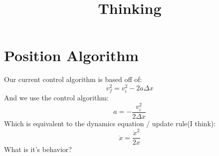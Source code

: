 \documentclass{article}
\begin{document}
\title{Thinking}
\maketitle

\section*{Position Algorithm}
Our current control algorithm is based off of:
\begin{equation}
	v_f^2=v_i^2-2a\Delta x
\end{equation}
And we use the control algorithm:
\begin{equation}
	a = -\frac{v_i^2}{2\Delta x}
\end{equation}
Which is equivalent to the dynamics equation / update rule(I think):
\begin{equation}
	\ddot x = \frac{\dot x ^2}{2x}
\end{equation}
What is it's behavior? 
\end{document}
